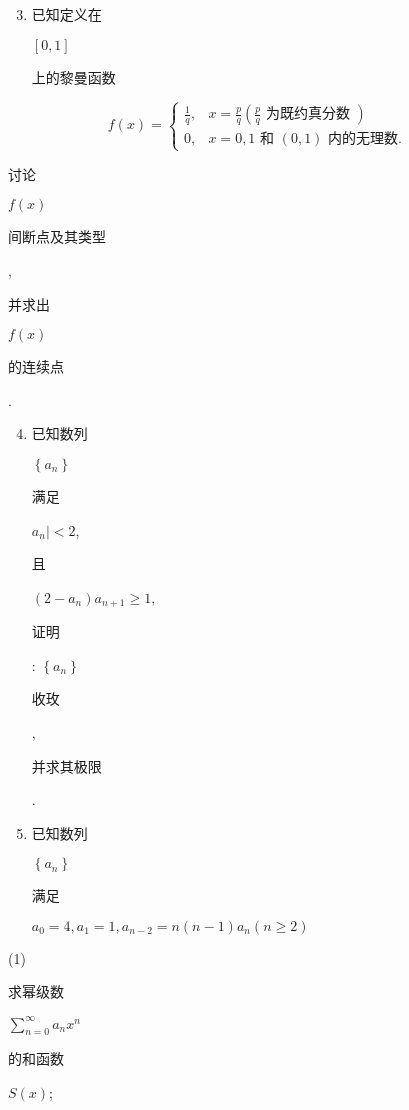 \documentclass[10pt]{article}
\begin{document}
\begin{enumerate}
  \setcounter{enumi}{2}
  \item \begin{CJK}{UTF8}{mj}已知定义在\end{CJK} $[0,1]$ \begin{CJK}{UTF8}{mj}上的黎曼函数\end{CJK}
\end{enumerate}
$$
f(x)= \begin{cases}\frac{1}{q}, & x=\frac{p}{q}\left(\frac{p}{q} \text { 为既约真分数 }\right) \\ 0, & x=0,1 \text { 和 }(0,1) \text { 内的无理数. }\end{cases}
$$
\begin{CJK}{UTF8}{mj}讨论\end{CJK} $f(x)$ \begin{CJK}{UTF8}{mj}间断点及其类型\end{CJK}, \begin{CJK}{UTF8}{mj}并求出\end{CJK} $f(x)$ \begin{CJK}{UTF8}{mj}的连续点\end{CJK}.

\begin{enumerate}
  \setcounter{enumi}{3}
  \item \begin{CJK}{UTF8}{mj}已知数列\end{CJK} $\left\{a_{n}\right\}$ \begin{CJK}{UTF8}{mj}满足\end{CJK} $a_{n} \mid<2$, \begin{CJK}{UTF8}{mj}且\end{CJK} $\left(2-a_{n}\right) a_{n+1} \geq 1$, \begin{CJK}{UTF8}{mj}证明\end{CJK}: $\left\{a_{n}\right\}$ \begin{CJK}{UTF8}{mj}收玫\end{CJK}, \begin{CJK}{UTF8}{mj}并求其极限\end{CJK}.

  \item \begin{CJK}{UTF8}{mj}已知数列\end{CJK} $\left\{a_{n}\right\}$ \begin{CJK}{UTF8}{mj}满足\end{CJK} $a_{0}=4, a_{1}=1, a_{n-2}=n(n-1) a_{n}(n \geq 2)$

\end{enumerate}
(1) \begin{CJK}{UTF8}{mj}求幂级数\end{CJK} $\sum_{n=0}^{\infty} a_{n} x^{n}$ \begin{CJK}{UTF8}{mj}的和函数\end{CJK} $S(x)$;
\end{document}
